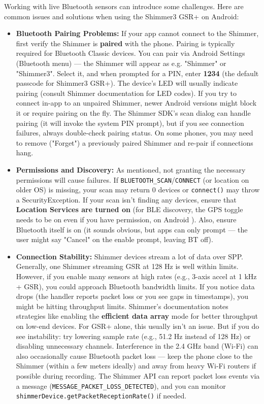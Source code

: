 {{Working with live Bluetooth sensors can introduce some challenges. Here
are common issues and solutions when using the Shimmer3 GSR+ on Android:

\begin{itemize}
\item \textbf{Bluetooth Pairing Problems:} If your app cannot connect to the
  Shimmer, first verify the Shimmer is \textbf{paired} with the phone.
  Pairing is typically required for Bluetooth Classic devices. You can
  pair via Android Settings (Bluetooth menu) --- the Shimmer will appear
  as e.g. "Shimmer" or "Shimmer3". Select it, and when prompted for a
  PIN, enter \textbf{1234} (the default passcode for Shimmer3
  GSR+)\cite{ElectrodermalActivityWiki}.
  The device's LED will usually indicate pairing (consult Shimmer
  documentation for LED codes). If you try to connect in-app to an
  unpaired Shimmer, newer Android versions might block it or require
  pairing on the fly. The Shimmer SDK's scan dialog can handle pairing
  (it will invoke the system PIN prompt), but if you see connection
  failures, always double-check pairing status. On some phones, you may
  need to remove ("Forget") a previously paired Shimmer and re-pair if
  connections hang.

\item \textbf{Permissions and Discovery:} As mentioned, not granting the
  necessary permissions will cause failures. If
  \texttt{BLUETOOTH_SCAN}/\texttt{CONNECT} (or location on older OS) is missing, your
  scan may return 0 devices or \texttt{connect()} may throw a
  SecurityException. If your scan isn't finding any devices, ensure that
  \textbf{Location Services are turned on} (for BLE discovery, the GPS toggle
  needs to be on even if you have permission, on Android ). Also,
  ensure Bluetooth itself is on (it sounds obvious, but apps can only
  prompt --- the user might say "Cancel" on the enable prompt, leaving BT
  off).

\item \textbf{Connection Stability:} Shimmer devices stream a lot of data over
  SPP. Generally, one Shimmer streaming GSR at 128 Hz is well within
  limits. However, if you enable many sensors at high rates (e.g.,
  3-axis accel at 1 kHz + GSR), you could approach Bluetooth bandwidth
  limits. If you notice data drops (the handler reports packet loss or
  you see gaps in timestamps), you might be hitting throughput limits.
  Shimmer's documentation notes strategies like enabling the \textbf{efficient
  data array} mode for better throughput on low-end
  devices\cite{DeviceServer}.
  For GSR+ alone, this usually isn't an issue. But if you do see
  instability: try lowering sample rate (e.g., 51.2 Hz instead of 128
  Hz) or disabling unnecessary channels. Interference in the 2.4 GHz
  band (Wi-Fi) can also occasionally cause Bluetooth packet loss --- keep
  the phone close to the Shimmer (within a few meters ideally) and away
  from heavy Wi-Fi routers if possible during recording. The Shimmer API
  can report packet loss events via a message
  (\texttt{MESSAGE_PACKET_LOSS_DETECTED}), and you can monitor
  \texttt{shimmerDevice.getPacketReceptionRate()} if needed.


\end{itemize}}}
